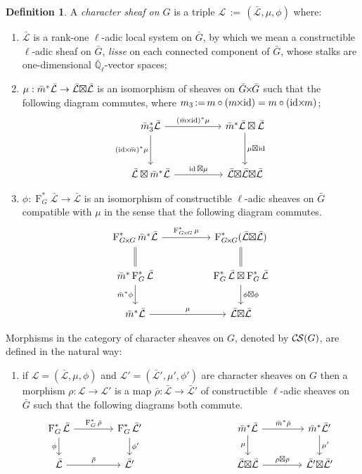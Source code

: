 \documentclass[10pt]{amsart}
\makeatletter
\theoremstyle{plain}
\theoremstyle{definition}
\newtheorem{definition}[theorem]{Definition}
\theoremstyle{remark}
\newcommand{\EE}{\mathbb{\bar Q}_\ell}
\newcommand{\Frob}[1]{\operatorname{F}_{#1}}
\DeclareMathOperator{\id}{id}
\newcommand{\ceq}{{\, :=\, }}
\newcommand{\cs}[1]{{\mathcal{#1}}}
\newcommand{\gcs}[1]{{\mathcal{\bar #1}}}
\newcommand{\CS}{{\mathcal{C\hskip-0.8pt S}}}
\newcommand{\labitem}[2]{
\def\@itemlabel{\textbf{#1}}
\item
\def\@currentlabel{#1}\label{#2}}
\newcommand{\bm}{\bar{m}}
\newcommand{\bG}{\bar{G}}
\newcommand{\brho}{{\bar\rho}}
\newcommand{\tight}[3]{\hspace{-#1pt}{#2}\hspace{-#3pt}}
\newcommand{\bGxG}{\text{$\bar{G} \tight{1}{\times}{1} \bar{G}$}}
\newcommand{\GxxG}{\text{$G \tight{1}{\times}{1} G$}}
\newcommand{\LxL}{\text{$\gcs{L} \tight{0}{\boxtimes}{0} \gcs{L}$}}
\makeatother
\begin{document}
\begin{definition}\label{def:CS}
A \emph{character sheaf on $G$} is a triple
$\cs{L}\ceq (\gcs{L},\mu,\phi)$ where:
\begin{enumerate}
\labitem{(CS.1)}{CS.1} $\gcs{L}$ is a rank-one $\ell$-adic local system on $\bG$, by which we mean a constructible $\ell$-adic sheaf on $\bG$, {\it lisse} on each connected component of $\bG$, whose stalks are one-dimensional $\EE$-vector spaces;
\labitem{(CS.2)}{CS.2} $\mu: \bm^* \gcs{L} \to \LxL$ is an isomorphism of
sheaves on $\bGxG$ such that the following diagram commutes,
  where $m_3 \ceq m\circ (m\tight{1}{\times}{2}\id) = m\circ (\id\tight{2}{\times}{1} m)$;
  \[
  \begin{tikzcd}[row sep=30]
  \bm_3^*\gcs{L} \arrow{rr}{(\bm \tight{1}{\times}{2} \id)^*\mu} \arrow[swap]{d}{(\id \tight{2}{\times}{1} \bm)^*\mu}
    &&  \bm^*\gcs{L} \boxtimes \gcs{L} \dar{\mu \tight{0}{\boxtimes}{1} \id} \\
    \gcs{L} \boxtimes \bm^* \gcs{L} \arrow{rr}{\id \boxtimes \mu}
    &&  \gcs{L} \tight{0}{\boxtimes}{0} \LxL
  \end{tikzcd}
  \]
\labitem{(CS.3)}{CS.3} $\phi : \Frob{G}^* \gcs{L} \to \gcs{L}$ is an
  isomorphism of constructible $\ell$-adic sheaves on $\bG$ compatible with
  $\mu$ in the sense that the following diagram commutes.
  \[
  \begin{tikzcd}[row sep=20]
  \Frob{\GxxG}^* \bm^* \gcs{L} \arrow{rr}{\Frob{\GxxG}^*\mu}
    && \Frob{\GxxG}^*(\LxL)\\
    \arrow[equal]{u} \bm^*  \Frob{G}^* \gcs{L} \arrow[swap]{d}{\bm^* \phi}
    && \Frob{G}^*\gcs{L}\boxtimes \Frob{G}^*\gcs{L} \dar{\phi\boxtimes \phi} \arrow[equal]{u} \\
    \bm^*\gcs{L} \arrow{rr}{\mu}
    && \LxL
  \end{tikzcd}
  \]
\end{enumerate}
\end{definition}

Morphisms in the category of character sheaves on $G$, denoted by $\CS(G)$, are defined in the natural way:
\begin{enumerate}
\labitem{(CS.4)}{CS.4} if $\cs{L} = (\gcs{L},\mu,\phi)$ and
  $\cs{L'} = (\gcs{L'},\mu',\phi')$ are character sheaves on $G$ then
  a morphism $\rho : \cs{L} \to \cs{L}'$ is a map $\brho : \gcs{L} \to \gcs{L'}$
  of constructible $\ell$-adic sheaves on $\bG$ such that the following diagrams both commute.
  \[
  \begin{tikzcd}[column sep=40]
  \Frob{G}^* \gcs{L} \rar{\Frob{G}^* \brho} \arrow[swap]{d}{\phi} & \Frob{G}^* \gcs{L'} \dar{\phi'}
  & & \arrow[swap]{d}{\mu} \bm^* \gcs{L} \rar{\bm^* \brho} & \bm^* \gcs{L'} \dar{\mu'} \\
  \gcs{L} \rar{\brho} & \gcs{L'}
  & {} & \LxL \rar{\tight{1}{\rho\boxtimes \rho}{1}} & \gcs{L'} \tight{0}{\boxtimes}{0} \gcs{L'}
  \end{tikzcd}
  \]
\end{enumerate}
\end{document}
